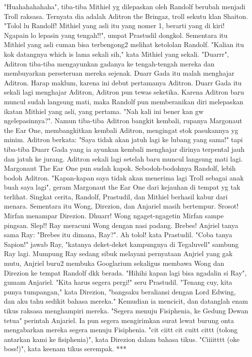 \documentclass[a4paper,11pt,final]{article}
\begin{document}
"Huahahahahaha", tiba-tiba Mithiel yg dilepaskan oleh Randolf berubah menjadi Troll raksasa. Ternyata dia adalah Aditron the Bringaz, troll sekutu klan Shaiton.
"Tolol lu Randolf! Mithiel yang asli itu yang nomer 1, berarti yang di kiri! Ngapain lo lepasin yang tengah!!", umpat Prastudil dongkol. Sementara itu Mithiel yang asli cuman bisa terbengong2 melihat ketololan Randolf.
"Kalian itu kok datangnya which is lama sekali sih," kata Mithiel yang sekali.
"Duarrr", Aditron tiba-tiba mengayunkan gadanya ke tengah-tengah mereka dan membuyarkan perseteruan mereka sejenak.
Duarr Gada itu malah menghajar Aditron. Harap maklum, karena ini debut pertamanya Aditron. Duarr Gada itu sekali lagi menghajar Aditron, Aditron pun tewas seketika.
Karena Aditron baru muncul sudah langsung mati, maka Randolf pun memberanikan diri melepaskan ikatan Mithiel yang asli, yang pertama. "Nah kali ini bener kan gw ngelepasinnya?".
Namun tiba-tiba Aditron bangkit kembali, rupanya Margonaut the Ear One, membangkitkan kembali Aditron, mengingat stok pasukannya yg minim.
Aditron berkata: "Saya tidak akan jatuh lagi ke lubang yang sama!" tapi tiba-tiba Duarr Gada yang ia ayunkan kembali menghajar dirinya terpental jauh dan jatuh ke jurang.
Aditron sekali lagi setelah baru muncul langsung mati lagi.
Margonaut The Ear One pun sudah kapok. Sebodoh-bodohnya Randolf, lebih bodoh Aditron.
"Kapan-kapan saya tidak akan menerima lagi Troll sebagai anak buah saya lagi", geram Margonaut the Ear One dari kejauhan di tempat yg tak terlihat.
Singkat cerita, Randolf, Prastudil, dan Mithiel berhasil kabur dari menara. Sementara itu Wong, Direzion, dan Anjariel masih bertempur.
Srosot! Mirfan menampar Direzion. Dhuarr! Wong ngaget-ngagetin Mirfan sampe pingsan. Slep!! Ray meracuni Wong dengan nasi padang. Brebes! Anjriel tanya sama Ray: "Brebes itu dimana, Ray?". Ah tolol! kata Prastudil.
"Coba tanya Sapion!" jawab Ray, "katanya deket-deket kampungnya di Tegaluvell" sambung Ray lagi.
Mumpung Ray sedang sibuk melayani pernyataan Anjriel yang gak mutu, Anjriel buru2 membuka Googlarium sekaligus membawa Wong dan Direzion ke tempat Randolf dkk berada. "Hihihi kapan lagi bisa ngadalin si Ray", gumam Anjariel.
"Kita harus segera pergi!" seru Prastudil. "Tenang cuy, kita punya tumpangan," kata Direzion, "bangsaku beraliansi dengan Lord Edwing, dan aku tahu sedikit bahasa mereka." Kemudian ia mencicit, dan datanglah enam tikus raksasa menghampiri mereka.
"Segera menuju Fisiphenia, ke Gedung Dewan tetua" perintah Anjariel. Ia pun segera mengirimkan surat lewat burung onta mengabarkan mereka segera menuju Fisiphenia.
"cit ciitt cit cuitt cittt (tolong antarkan kami ke fisiphenia)", kata Direzion dalam bahasa tikus. "Ciiiitttt (oke boss!)", kata keenam tikus serempak.
***
\end{document}
